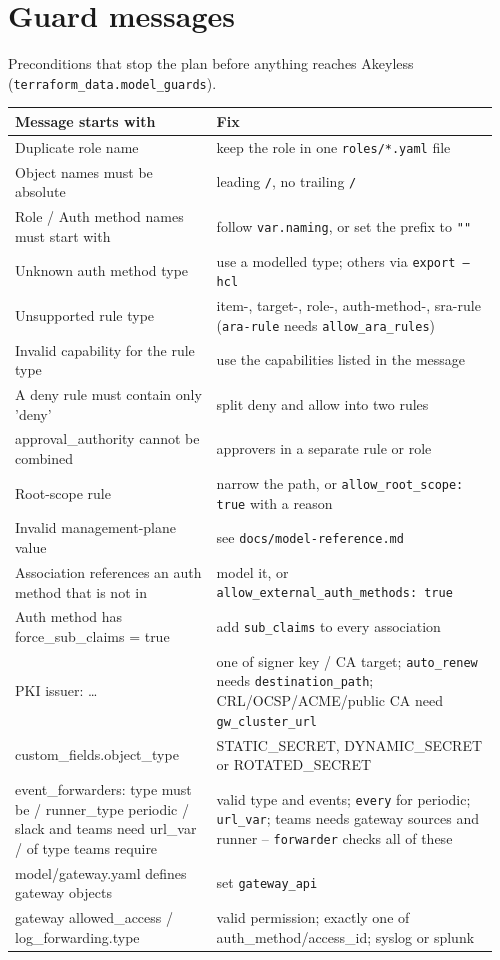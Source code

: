 \chapter{Guard messages}\label{app:guards}
Preconditions that stop the plan before anything reaches Akeyless (\texttt{terraform\_data.model\_guards}).
{\small
\begin{longtable}{@{}>{\raggedright\arraybackslash}p{0.4\linewidth}>{\raggedright\arraybackslash}p{0.56\linewidth}@{}}
\toprule
\textbf{Message starts with} & \textbf{Fix} \\ \midrule\endhead
Duplicate role name & keep the role in one \texttt{roles/*.yaml} file \\
Object names must be absolute & leading \texttt{/}, no trailing \texttt{/} \\
Role / Auth method names must start with & follow \texttt{var.naming}, or set the prefix to \texttt{""} \\
Unknown auth method type & use a modelled type; others via \texttt{export --hcl} \\
Unsupported rule type & item-, target-, role-, auth-method-, sra-rule (\texttt{ara-rule} needs \texttt{allow\_ara\_rules}) \\
Invalid capability for the rule type & use the capabilities listed in the message \\
A deny rule must contain only 'deny' & split deny and allow into two rules \\
approval\_authority cannot be combined & approvers in a separate rule or role \\
Root-scope rule & narrow the path, or \texttt{allow\_root\_scope: true} with a reason \\
Invalid management-plane value & see \texttt{docs/model-reference.md} \\
Association references an auth method that is not in & model it, or \texttt{allow\_external\_auth\_methods: true} \\
Auth method has force\_sub\_claims = true & add \texttt{sub\_claims} to every association \\
PKI issuer: \ldots & one of signer key / CA target; \texttt{auto\_renew} needs \texttt{destination\_path}; CRL/OCSP/ACME/public CA need \texttt{gw\_cluster\_url} \\
custom\_fields.object\_type & STATIC\_SECRET, DYNAMIC\_SECRET or ROTATED\_SECRET \\
event\_forwarders: type must be / runner\_type periodic / slack and teams need url\_var / of type teams require & valid type and events; \texttt{every} for periodic; \texttt{url\_var}; teams needs gateway sources and runner -- \texttt{forwarder} checks all of these \\
model/gateway.yaml defines gateway objects & set \texttt{gateway\_api} \\
gateway allowed\_access / log\_forwarding.type & valid permission; exactly one of auth\_method/access\_id; syslog or splunk \\
\bottomrule
\end{longtable}}

